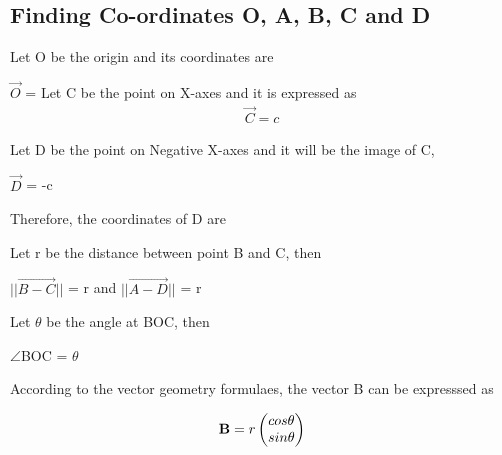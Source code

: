 \documentclass[journal,10pt,twocolumn]{article}
\begin{document}
\subsection{Finding Co-ordinates O, A, B, C and D}
\begin{flushleft}
Let O be the origin and its coordinates are\\
\vspace{0.25cm}

\center
\vspace{0.4cm}
$\vec{O}$ = 
\endcenter{}
\vspace{0.25cm}
Let C be the point on X-axes and it is expressed as\\
\vspace{0.25cm}
\begin{align}
    \vec{C} = c
    \end{align}

\vspace{0.25cm}
\begin{flushleft}
Let D be the point on Negative X-axes and it will be the image of C,\\
\begin{center}
$\vec{D}$  = -c\\
\end{center}
\vspace{0.2cm}
Therefore, the coordinates of D are\\
\end{flushleft}


\vspace{0.25cm}
\begin{flushleft}
Let r be the distance between point B and C, then\\
\end{flushleft}

\vspace{0.25cm}
$|| \vec{B-C} || $ = r and $|| \vec{A-D} || $ = r\\
\vspace{0.25cm}
\begin{flushleft}
Let $\theta$ be the angle at BOC, then\\
\end{flushleft}
\vspace{0.25cm}
$\angle$BOC = $\theta$\\
\vspace{0.25cm}
\begin{flushleft}
According to the vector geometry formulaes, the vector B can be expresssed as\\
\end{flushleft}
\vspace{0.25cm}
\begin{align}
   \mathbf{B}= r \begin{pmatrix}cos\theta \\ sin\theta\end{pmatrix}
\end{align}


\end{flushleft}
\end{document}
